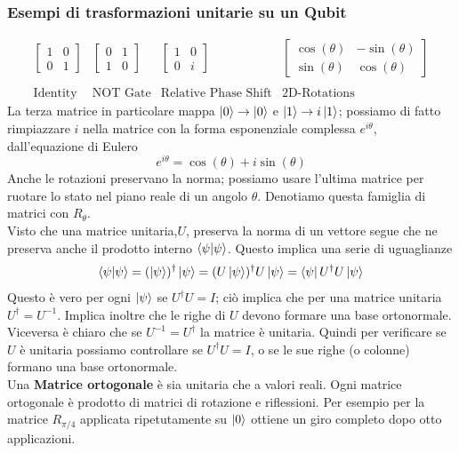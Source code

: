 \documentclass{article}
\begin{document}
    \subsubsection{Esempi di trasformazioni unitarie su un Qubit}
    \[
    \begin{array}{cccc}
    \begin{bmatrix} 1 & 0 \\ 0 & 1 \end{bmatrix} &
    \begin{bmatrix} 0 & 1 \\ 1 & 0 \end{bmatrix} &
    \begin{bmatrix} 1 & 0 \\ 0 & i \end{bmatrix} &
    \begin{bmatrix} \cos(\theta) & -\sin(\theta) \\ \sin(\theta) & \cos(\theta) \end{bmatrix} \\[-1ex]
    \\
    \text{Identity} & \text{NOT Gate} & \text{Relative Phase Shift} & \text{2D-Rotations}
    \end{array}
    \]
    La terza matrice in particolare mappa $\ket{0}\rightarrow \ket{0}$ e $\ket{1}\rightarrow i\ket{1}$; possiamo di fatto rimpiazzare $i$ nella matrice con la forma esponenziale complessa $e^{i\theta}$, dall'equazione di Eulero
    \begin{equation}
        e^{i\theta} = \cos(\theta) + i \sin(\theta)
    \end{equation}
    Anche le rotazioni preservano la norma; possiamo usare l'ultima matrice per ruotare lo stato nel piano reale di un angolo $\theta$. Denotiamo questa famiglia di matrici con $R_\theta$.
    \\
    Visto che una matrice unitaria,$U$, preserva la norma di un vettore segue che ne preserva anche il prodotto interno $\braket{\psi|\psi}$. Questo implica una serie di uguaglianze
    \[
    \braket{\psi|\psi} = (\ket{\psi})^\dagger\ket{\psi} = (U\ket{\psi})^\dagger U\ket{\psi} = \bra{\psi}U^\dagger U \ket{\psi} 
    \]
    Questo è vero per ogni $\ket{\psi}$ se $U^\dagger U = I$; ciò implica che per una matrice unitaria $U^\dagger = U^{-1}$. Implica inoltre che le righe di $U$ devono formare una base ortonormale. Viceversa è chiaro che se $U^{-1} = U^\dagger$ la matrice è unitaria. Quindi per verificare se $U$ è unitaria possiamo controllare se $U^\dagger U= I$, o se le sue righe (o colonne) formano una base ortonormale.
    \medskip
    \\ Una \textbf{Matrice ortogonale} è sia unitaria che a valori reali. Ogni matrice ortogonale è prodotto di matrici di rotazione e riflessioni. Per esempio per la matrice $R_{\pi/4}$ applicata ripetutamente su $\ket{0}$ ottiene un giro completo dopo otto applicazioni.
\end{document}
